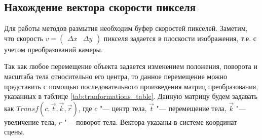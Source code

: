 \subsection{Нахождение вектора скорости пикселя}

Для работы методов размытия необходим буфер скоростей пикселей. Заметим, что скорость $v = \begin{pmatrix}
        {\Delta x} & {\Delta y}
    \end{pmatrix}$ пикселя задается в плоскости изображения, т.е. с учетом преобразований камеры.

Так как любое перемещение объекта задается изменением положения, поворота и масштаба тела относительно его центра, то данное перемещение можно представить с помощью последовательного произведения матриц преобразования, указанных в таблице \ref{tab:tranformations_table}. Данную матрицу будем задавать как $Transf(c, \vec{t}, \vec{k}, \vec{r})$, где $c$ "--- центр тела, $\vec{t}$ "--- перемещение тела, $\vec{k}$ "--- увеличение тела, $r$ "--- поворот тела. Вектора указаны в системе координат сцены.

